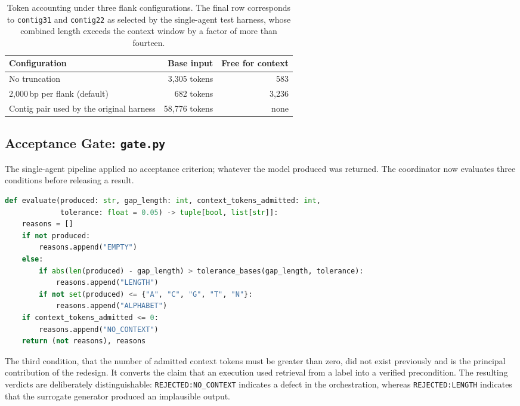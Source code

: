 \begin{table}[H]
\centering
\begin{tabular}{lrr}
\toprule
\textbf{Configuration} & \textbf{Base input} & \textbf{Free for context} \\
\midrule
No truncation                              &  3{,}305 tokens & 583 \\
2{,}000\,bp per flank (default)            &     682 tokens & 3{,}236 \\
Contig pair used by the original harness   & 58{,}776 tokens & none \\
\bottomrule
\end{tabular}
\caption{Token accounting under three flank configurations. The final row corresponds to
\texttt{contig31} and \texttt{contig22} as selected by the single-agent test harness, whose
combined length exceeds the context window by a factor of more than fourteen.}
\label{tab:budget}
\end{table}

\subsection{Acceptance Gate: \texttt{gate.py}}

The single-agent pipeline applied no acceptance criterion; whatever the model produced was
returned. The coordinator now evaluates three conditions before releasing a result.

\begin{lstlisting}[language=Python]
def evaluate(produced: str, gap_length: int, context_tokens_admitted: int,
             tolerance: float = 0.05) -> tuple[bool, list[str]]:
    reasons = []
    if not produced:
        reasons.append("EMPTY")
    else:
        if abs(len(produced) - gap_length) > tolerance_bases(gap_length, tolerance):
            reasons.append("LENGTH")
        if not set(produced) <= {"A", "C", "G", "T", "N"}:
            reasons.append("ALPHABET")
    if context_tokens_admitted <= 0:
        reasons.append("NO_CONTEXT")
    return (not reasons), reasons
\end{lstlisting}

The third condition, that the number of admitted context tokens must be greater than zero, did
not exist previously and is the principal contribution of the redesign. It converts the claim
that an execution used retrieval from a label into a verified precondition. The resulting
verdicts are deliberately distinguishable: \texttt{REJECTED:NO\_CONTEXT} indicates a defect in
the orchestration, whereas \texttt{REJECTED:LENGTH} indicates that the surrogate generator
produced an implausible output.

